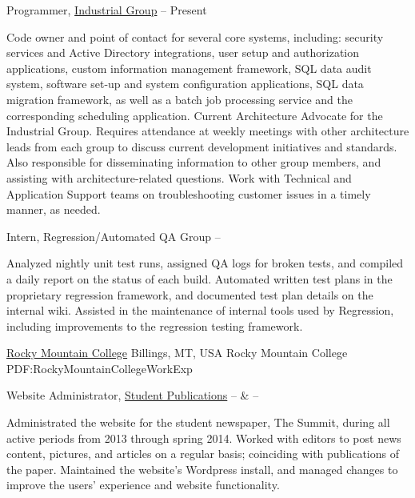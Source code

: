 \documentclass[letterpaper,MMMyyyy,nonstopmode]{simpleresumecv}
\begin{document}
\begin{Body}
\Entry
Programmer,
\href{http://www.cu.net/industrial}
{Industrial Group}
\hfill
{} --
Present
\begin{Detail}
\BulletItem
Code owner and point of contact for several core systems, including: security services and Active Directory integrations, user setup and authorization applications, custom information management framework, SQL data audit system, software set-up and system configuration applications, SQL data migration framework, as well as a batch job processing service and the corresponding scheduling application.
\BulletItem
Current Architecture Advocate for the Industrial Group. Requires attendance at weekly meetings with other architecture leads from each group to discuss current development initiatives and standards. Also responsible for disseminating information to other group members, and assisting with architecture-related questions.
\BulletItem
Work with Technical and Application Support teams on troubleshooting customer issues in a timely manner, as needed.
\end{Detail}

\Gap

\Entry
Intern,
Regression/Automated QA Group
\hfill
{} --
\begin{Detail}
\BulletItem
Analyzed nightly unit test runs, assigned QA logs for broken tests, and compiled a daily report on the status of each build.
\BulletItem
Automated written test plans in the proprietary regression framework, and documented test plan details on the internal wiki.
\BulletItem
Assisted in the maintenance of internal tools used by Regression, including improvements to the regression testing framework.
\end{Detail}

\Gap

\SubSection
{\href{http://www.rocky.edu}
{Rocky Mountain College}
\hfill Billings, MT, USA}
{Rocky Mountain College}
{PDF:RockyMountainCollegeWorkExp}

\Entry
Website Administrator,
\href{http://summit.rocky.edu}
{Student Publications}
\hfill
{} --
 \&
 --
\begin{Detail}
\BulletItem
Administrated the website for the student newspaper, The Summit, during all active periods from 2013 through spring 2014.
\BulletItem
Worked with editors to post news content, pictures, and articles on a regular basis; coinciding with publications of the paper.
\BulletItem
Maintained the website's Wordpress install, and managed changes to improve the users' experience and website functionality.
\end{Detail}


\end{Body}
\end{document}
